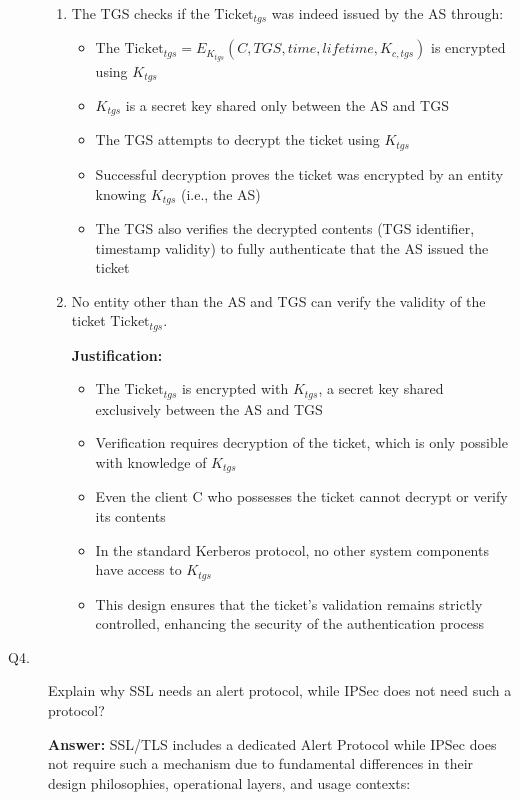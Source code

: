 \documentclass[11pt]{article}
\begin{document}
\begin{description}
\begin{enumerate}
    \item The TGS checks if the $\mbox{Ticket}_{tgs}$ was indeed issued by the AS through:
    \begin{itemize}
        \item The $\mbox{Ticket}_{tgs} = E_{K_{tgs}}(C, TGS, time, lifetime, K_{c,tgs})$ is encrypted using $K_{tgs}$
        \item $K_{tgs}$ is a secret key shared only between the AS and TGS
        \item The TGS attempts to decrypt the ticket using $K_{tgs}$
        \item Successful decryption proves the ticket was encrypted by an entity knowing $K_{tgs}$ (i.e., the AS)
        \item The TGS also verifies the decrypted contents (TGS identifier, timestamp validity) to fully authenticate that the AS issued the ticket
    \end{itemize}
    
    \item No entity other than the AS and TGS can verify the validity of the ticket $\mbox{Ticket}_{tgs}$.
    
    \textbf{Justification:}
    \begin{itemize}
        \item The $\mbox{Ticket}_{tgs}$ is encrypted with $K_{tgs}$, a secret key shared exclusively between the AS and TGS
        \item Verification requires decryption of the ticket, which is only possible with knowledge of $K_{tgs}$
        \item Even the client C who possesses the ticket cannot decrypt or verify its contents
        \item In the standard Kerberos protocol, no other system components have access to $K_{tgs}$
        \item This design ensures that the ticket's validation remains strictly controlled, enhancing the security of the authentication process
    \end{itemize}
    \end{enumerate}


\item[Q4.] 
Explain why SSL needs an alert protocol, while IPSec does not need such a protocol?   \hfill {} 


\textbf{Answer:}
    SSL/TLS includes a dedicated Alert Protocol while IPSec does not require such a mechanism due to fundamental differences in their design philosophies, operational layers, and usage contexts:
    

\end{description}
\end{document}
